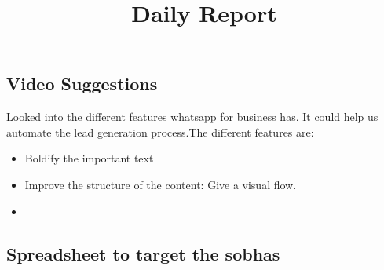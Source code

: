 \documentclass[12pt, a4paper]{article}
\begin{document}
\title{Daily Report}
\maketitle

\subsection{Video Suggestions}

Looked into the different features whatsapp for business has. It could help us automate the lead generation process.The different features are:

\begin{itemize}
    \item Boldify the important text
    \item Improve the structure of the content: Give a visual flow.
    \item
\end{itemize}


\vspace{0.5cm}

\subsection{Spreadsheet to target the sobhas}


\vspace{0.25cm}
\end{document}
